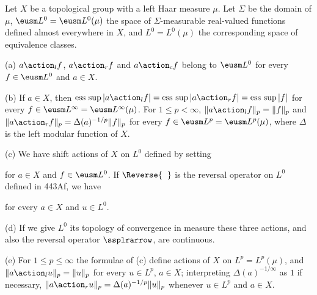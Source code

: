 
 Let $X$ be a topological group with a left Haar
measure $\mu$.   Let $\Sigma$ be the domain of $\mu$,
$\eusm L^0=\eusm L^0(\mu)$ the space of $\Sigma$-measurable real-valued
functions defined
almost everywhere in $X$, and $L^0=L^0(\mu)$ the corresponding space of
equivalence classes.

(a) $a\action_lf$, $a\action_rf$ and
$a\action_cf$ belong to $\eusm L^0$ for
every $f\in\eusm L^0$ and $a\in X$.

(b) If $a\in X$, then
$\esssup|a\action_lf|=\esssup|a\action_rf|=\esssup|f|$ for every
$f\in\eusm L^{\infty}=\eusm L^{\infty}(\mu)$.   For
$1\le p<\infty$, $\|a\action_lf\|_p=\|f\|_p$ and
$\|a\action_rf\|_p=\Delta(a)^{-1/p}\|f\|_p$ for every
$f\in\eusm L^p=\eusm L^p(\mu)$, where $\Delta$ is the left modular
function of $X$.

(c) We have shift actions of $X$ on $L^0$ defined by setting


\noindent for $a\in X$ and $f\in\eusm L^0$.   If
$\Reverse{\phantom{x}}$ is
the reversal operator on $L^0$ defined in 443Af, we have


\noindent for every $a\in X$ and $u\in L^0$.

(d) If we give $L^0$ its
topology of convergence in measure these three actions, and also the
reversal operator $\ssplrarrow$, are continuous.

(e) For $1\le p\le\infty$ the formulae of (c) define actions of $X$ on
$L^p=L^p(\mu)$, and $\|a\action_lu\|_p=\|u\|_p$ for every $u\in L^p$,
$a\in X$;  interpreting $\Delta(a)^{-1/\infty}$ as $1$ if necessary,
$\|a\action_ru\|_p=\Delta(a)^{-1/p}\|u\|_p$ whenever $u\in L^p$ and
$a\in X$.

